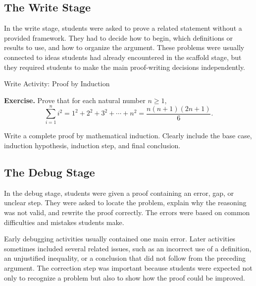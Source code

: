 \documentclass[12pt]{article}
\begin{document}
\subsection{The Write Stage}

In the write stage, students were asked to prove a related statement without a provided framework. They had to decide how to begin, which definitions or results to use, and how to organize the argument. These problems were usually connected to ideas students had already encountered in the scaffold stage, but they required students to make the main proof-writing decisions independently.


\begin{activitybox}{Write Activity: Proof by Induction}

\textbf{Exercise.}
Prove that for each natural number \(n\geq 1\),
\[
    \sum_{i=1}^{n} i^2
    =
    1^2+2^2+3^2+\cdots+n^2
    =
    \frac{n(n+1)(2n+1)}{6}.
\]

Write a complete proof by mathematical induction. Clearly include the base case, induction hypothesis, induction step, and final conclusion.

\end{activitybox}

\subsection{The Debug Stage}

In the debug stage, students were given a proof containing an error, gap, or unclear step. They were asked to locate the problem, explain why the reasoning was not valid, and rewrite the proof correctly. The errors were based on common difficulties and mistakes students make.

Early debugging activities usually contained one main error. Later activities sometimes included several related issues, such as an incorrect use of a definition, an unjustified inequality, or a conclusion that did not follow from the preceding argument. The correction step was important because students were expected not only to recognize a problem but also to show how the proof could be improved.\\
\end{document}
